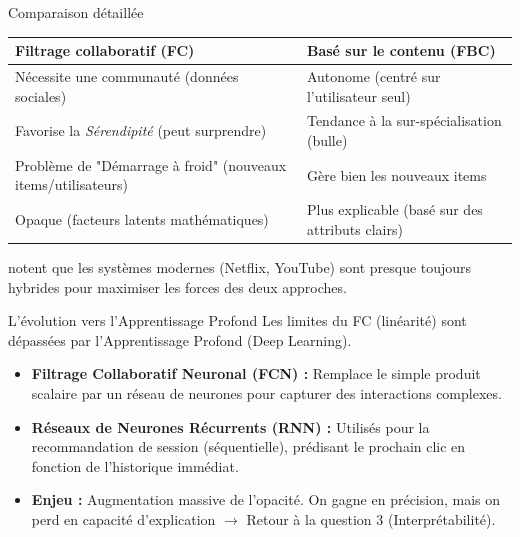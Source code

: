 \documentclass[9pt, aspectratio=169]{beamer}
\begin{document}
\begin{frame}{Comparaison détaillée}
    \begin{table}[]
        \centering
        \small
        \begin{tabular}{@{}p{5cm}p{5cm}@{}}
            \toprule
            \textbf{Filtrage collaboratif (FC)} & \textbf{Basé sur le contenu (FBC)} \\ \midrule
            Nécessite une communauté (données sociales) & Autonome (centré sur l'utilisateur seul) \\
            Favorise la \textit{Sérendipité} (peut surprendre) & Tendance à la sur-spécialisation (bulle) \\
            Problème de "Démarrage à froid" (nouveaux items/utilisateurs) & Gère bien les nouveaux items \\
            Opaque (facteurs latents mathématiques) & Plus explicable (basé sur des attributs clairs) \\ \bottomrule
        \end{tabular}
    \end{table}
    \textcite{Ko2020A} notent que les systèmes modernes (Netflix, YouTube) sont presque toujours hybrides pour maximiser les forces des deux approches.
\end{frame}

\begin{frame}{L'évolution vers l'Apprentissage Profond}
    Les limites du FC (linéarité) sont dépassées par l'Apprentissage Profond (Deep Learning).
    \begin{itemize}
        \item \textbf{Filtrage Collaboratif Neuronal (FCN) :} Remplace le simple produit scalaire par un réseau de neurones pour capturer des interactions complexes.
        \item \textbf{Réseaux de Neurones Récurrents (RNN) :} Utilisés pour la recommandation de session (séquentielle), prédisant le prochain clic en fonction de l'historique immédiat.
        \item \textbf{Enjeu :} Augmentation massive de l'opacité. On gagne en précision, mais on perd en capacité d'explication \(\rightarrow\) Retour à la question 3 (Interprétabilité).
    \end{itemize}
\end{frame}
\end{document}
